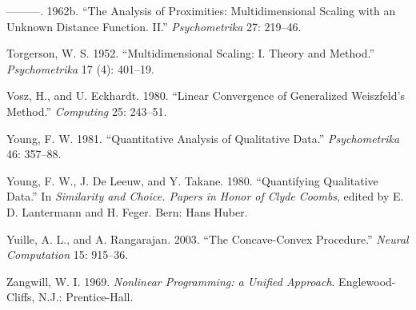 \documentclass[
  12pt,
]{article}
\newlength{\cslhangindent}
\newenvironment{CSLReferences}[2] %
 {\begin{list}{}{%
  \setlength{\itemindent}{0pt}
  \setlength{\leftmargin}{0pt}
  \setlength{\parsep}{0pt}
  \ifodd #1
   \setlength{\leftmargin}{\cslhangindent}
   \setlength{\itemindent}{-1\cslhangindent}
  \fi
  \setlength{\itemsep}{#2\baselineskip}}}
 {\end{list}}
\begin{document}
\begin{CSLReferences}{1}{0}
---------. 1962b. {``{The Analysis of Proximities: Multidimensional Scaling with an Unknown Distance Function. II}.''} \emph{Psychometrika} 27: 219--46.

Torgerson, W. S. 1952. {``{Multidimensional Scaling: I. Theory and Method}.''} \emph{Psychometrika} 17 (4): 401--19.

Vosz, H., and U. Eckhardt. 1980. {``{Linear Convergence of Generalized {W}eiszfeld's Method}.''} \emph{Computing} 25: 243--51.

Young, F. W. 1981. {``{Quantitative Analysis of Qualitative Data}.''} \emph{Psychometrika} 46: 357--88.

Young, F. W., J. De Leeuw, and Y. Takane. 1980. {``Quantifying Qualitative Data.''} In \emph{Similarity and Choice. Papers in Honor of Clyde Coombs}, edited by E. D. Lantermann and H. Feger. Bern: Hans Huber.

Yuille, A. L., and A. Rangarajan. 2003. {``{The Concave-Convex Procedure}.''} \emph{Neural Computation} 15: 915--36.

Zangwill, W. I. 1969. \emph{{Nonlinear Programming: a Unified Approach}}. Englewood-Cliffs, N.J.: Prentice-Hall.

\end{CSLReferences}
\end{document}
